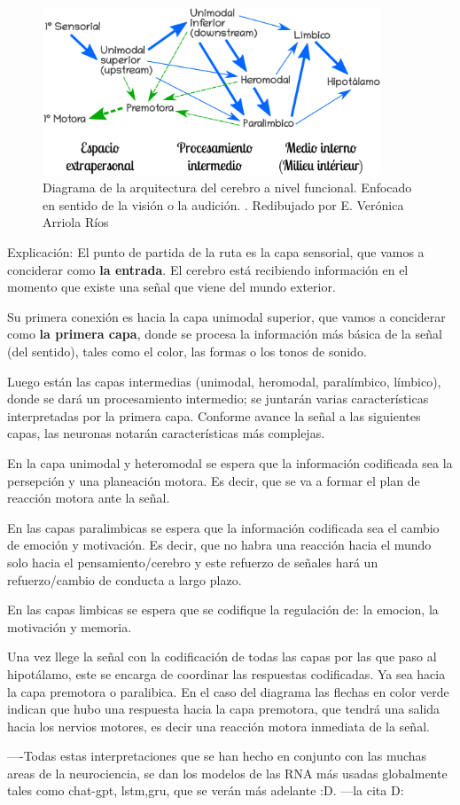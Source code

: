  \begin{figure}[h]
  \centering
  \includegraphics[width=0.9\textwidth]{../Figuras/zonasFuncionales.png}
  \caption{Diagrama de la arquitectura del cerebro a nivel funcional. Enfocado en sentido de la visión o la audición. \parencite{Mesulam1998}. Redibujado por E. Verónica Arriola Ríos}
  \label{fig:zonasFun}
 \end{figure}

Explicación: El punto de partida de la ruta es la capa sensorial, que vamos a conciderar como \textbf{la entrada}. El cerebro está recibiendo información en el momento que existe una señal que viene del mundo exterior.

Su primera conexión es hacia la capa unimodal superior, que vamos a conciderar como \textbf{la primera capa}, donde se procesa la información más básica de la señal (del sentido), tales como el color, las formas o los tonos de sonido.

Luego están las capas intermedias (unimodal, heromodal, paralímbico, límbico), donde se dará un procesamiento intermedio; se juntarán varias características interpretadas por la primera capa. Conforme avance la señal a las siguientes capas, las neuronas notarán características más complejas. 

En la capa unimodal y heteromodal se espera que la información codificada sea la persepción y una planeación motora. Es decir, que se va a formar el plan de reacción motora ante la señal. 

En las capas paralimbicas se espera que la información codificada sea el cambio de emoción y motivación. Es decir, que no habra una reacción hacia el mundo solo hacia el pensamiento/cerebro y este refuerzo de señales hará un refuerzo/cambio de conducta a largo plazo.

En las capas limbicas se espera que se codifique la regulación de: la emocion, la motivación y memoria.

Una vez llege la señal con la codificación de todas las capas por las que paso al hipotálamo, este se encarga de coordinar las respuestas codificadas. Ya sea hacia la capa premotora o paralibica. En el caso del diagrama las flechas en color verde indican que hubo una respuesta hacia la capa premotora, que tendrá una salida hacia los nervios motores, es decir una reacción motora inmediata de la señal. 

----Todas estas interpretaciones que se han hecho en conjunto con las muchas areas de la neurociencia, se dan los modelos de las RNA más usadas globalmente tales como chat-gpt, lstm,gru, que se verán más adelante :D. ---la cita D:





